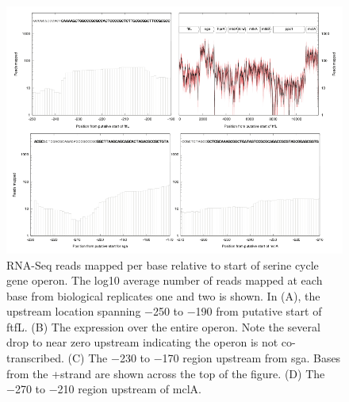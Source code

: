 \begin{figure}[H]
\centering
     \includegraphics[width=1.0\textwidth]{./tex/chapter1/figures/supplemental/FigureS4.png}
     \begin{singlespace}
     \caption[RNA-Seq reads mapped per base relative to start of serine cycle gene operon.]{
        RNA-Seq reads mapped per base relative to start of serine cycle gene operon.
        The log10 average number of reads mapped at each base from biological replicates one and two is shown.
        In (A), the upstream location spanning −250 to −190 from putative start of ftfL. (B) The expression over the entire operon.
        Note the several drop to near zero upstream indicating the operon is not co-transcribed. (C) The −230 to −170 region upstream from sga.
        Bases from the +strand are shown across the top of the figure. (D) The −270 to −210 region upstream of mclA.
        }
     \label{fig:S4} %
     \end{singlespace}
\end{figure}


